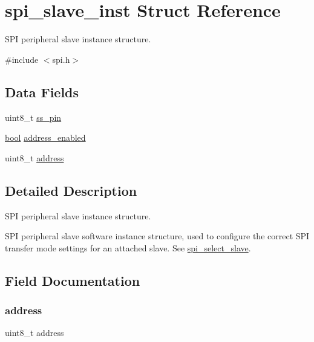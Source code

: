 \hypertarget{structspi__slave__inst}{}\section{spi\+\_\+slave\+\_\+inst Struct Reference}
\label{structspi__slave__inst}


S\+PI peripheral slave instance structure.  




{\ttfamily \#include $<$spi.\+h$>$}

\subsection*{Data Fields}
\begin{DoxyCompactItemize}
\item 
uint8\+\_\+t \mbox{\hyperlink{structspi__slave__inst_ae5fb738f754cc7a762c6cc179079b1d8}{ss\+\_\+pin}}
\item 
\mbox{\hyperlink{group__group__sam0__utils_ga97a80ca1602ebf2303258971a2c938e2}{bool}} \mbox{\hyperlink{structspi__slave__inst_adae5ab61ddeae146a96386325f8e038b}{address\+\_\+enabled}}
\item 
uint8\+\_\+t \mbox{\hyperlink{structspi__slave__inst_af3f726014b044194def151079f1f2d89}{address}}
\end{DoxyCompactItemize}


\subsection{Detailed Description}
S\+PI peripheral slave instance structure. 

S\+PI peripheral slave software instance structure, used to configure the correct S\+PI transfer mode settings for an attached slave. See \mbox{\hyperlink{group__asfdoc__sam0__sercom__spi__group_gaff6f75d83ec5251e6d1d42830b8af05f}{spi\+\_\+select\+\_\+slave}}. 

\subsection{Field Documentation}
\mbox{\label{structspi__slave__inst_af3f726014b044194def151079f1f2d89}} 
\subsubsection{\texorpdfstring{address}{address}}
{\footnotesize\ttfamily uint8\+\_\+t address}

